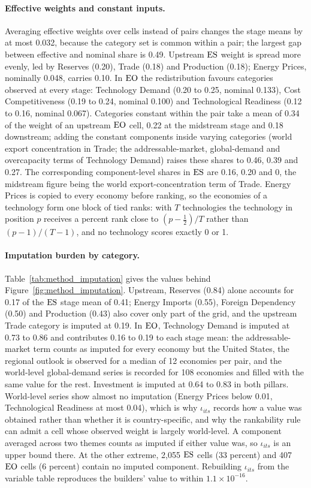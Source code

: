 \paragraph{Effective weights and constant inputs.} Averaging effective weights over cells instead
of pairs changes the stage means by at most 0.032, because the category set is common within a
pair; the largest gap between effective and nominal share is 0.49. Upstream $\mathrm{ES}$ weight is spread
more evenly, led by Reserves (0.20), Trade (0.18) and Production (0.18); Energy Prices, nominally
0.048, carries 0.10. In $\mathrm{EO}$ the redistribution favours categories observed at every stage:
Technology Demand (0.20 to 0.25, nominal 0.133), Cost Competitiveness (0.19 to 0.24, nominal 0.100)
and Technological Readiness (0.12 to 0.16, nominal 0.067). Categories constant within the pair take
a mean of 0.34 of the weight of an upstream $\mathrm{EO}$ cell, 0.22 at the midstream stage and 0.18
downstream; adding the constant components inside varying categories (world export concentration in
Trade; the addressable-market, global-demand and overcapacity terms of Technology Demand) raises
these shares to 0.46, 0.39 and 0.27. The corresponding component-level shares in $\mathrm{ES}$ are 0.16,
0.20 and 0, the midstream figure being the world export-concentration term of Trade. Energy Prices
is copied to every economy before ranking, so the economies of a technology form one block of tied
ranks: with $T$ technologies the technology in position $p$ receives a percent rank close to
$(p-\tfrac12)/T$ rather than $(p-1)/(T-1)$, and no technology scores exactly 0 or 1.

\paragraph{Imputation burden by category.} Table~\ref{tab:method_imputation} gives the values
behind Figure~\ref{fig:method_imputation}. Upstream, Reserves (0.84) alone accounts for 0.17 of the
$\mathrm{ES}$ stage mean of 0.41; Energy Imports (0.55), Foreign Dependency (0.50) and Production (0.43)
also cover only part of the grid, and the upstream Trade category is imputed at 0.19. In $\mathrm{EO}$,
Technology Demand is imputed at 0.73 to 0.86 and contributes 0.16 to 0.19 to each stage mean: the
addressable-market term counts as imputed for every economy but the United States, the regional
outlook is observed for a median of 12 economies per pair, and the world-level global-demand series
is recorded for 108 economies and filled with the same value for the rest. Investment is imputed at
0.64 to 0.83 in both pillars. World-level series show almost no imputation (Energy Prices below
0.01, Technological Readiness at most 0.04), which is why $\iota_{its}$ records how a value was
obtained rather than whether it is country-specific, and why the rankability rule can admit a cell
whose observed weight is largely world-level. A component averaged across two themes counts as
imputed if either value was, so $\iota_{its}$ is an upper bound there. At the other extreme, 2,055
$\mathrm{ES}$ cells (33 percent) and 407 $\mathrm{EO}$ cells (6 percent) contain no imputed component. Rebuilding
$\iota_{its}$ from the variable table reproduces the builders' value to within $1.1\times10^{-16}$.


